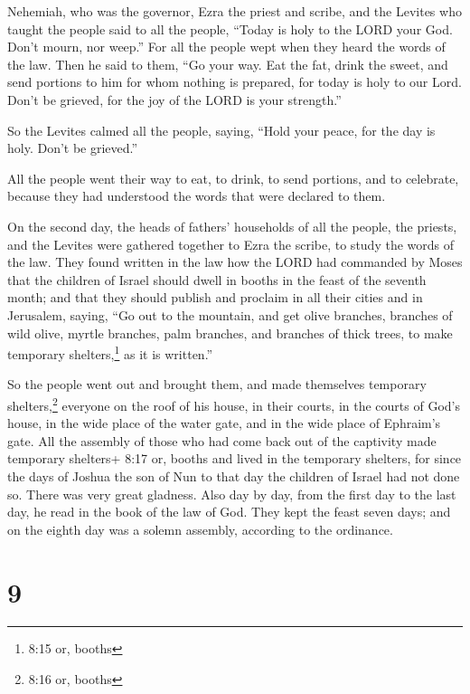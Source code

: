  Nehemiah, who was the governor, Ezra the priest and scribe,
and the Levites who taught the people said to all the people, ``Today is
holy to the LORD your God. Don't mourn, nor weep.'' For all the people
wept when they heard the words of the law.  Then he said to
them, ``Go your way. Eat the fat, drink the sweet, and send portions to
him for whom nothing is prepared, for today is holy to our Lord. Don't
be grieved, for the joy of the LORD is your strength.''

 So the Levites calmed all the people, saying, ``Hold your
peace, for the day is holy. Don't be grieved.''

 All the people went their way to eat, to drink, to send
portions, and to celebrate, because they had understood the words that
were declared to them.

 On the second day, the heads of fathers' households of all
the people, the priests, and the Levites were gathered together to Ezra
the scribe, to study the words of the law.  They found
written in the law how the LORD had commanded by Moses that the children
of Israel should dwell in booths in the feast of the seventh month;
 and that they should publish and proclaim in all their
cities and in Jerusalem, saying, ``Go out to the mountain, and get olive
branches, branches of wild olive, myrtle branches, palm branches, and
branches of thick trees, to make temporary shelters,\footnote{8:15 or,
  booths} as it is written.''

 So the people went out and brought them, and made
themselves temporary shelters,\footnote{8:16 or, booths} everyone on the
roof of his house, in their courts, in the courts of God's house, in the
wide place of the water gate, and in the wide place of Ephraim's gate.
 All the assembly of those who had come back out of the
captivity made temporary shelters+ 8:17 or, booths and lived in the
temporary shelters, for since the days of Joshua the son of Nun to that
day the children of Israel had not done so. There was very great
gladness.  Also day by day, from the first day to the last
day, he read in the book of the law of God. They kept the feast seven
days; and on the eighth day was a solemn assembly, according to the
ordinance.

\hypertarget{section-8}{%
\section{9}\label{section-8}}

